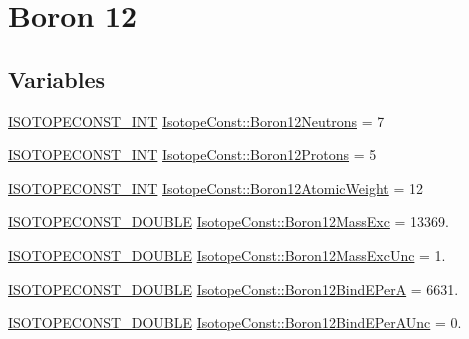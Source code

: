 \hypertarget{group___isotope_const-_boron-_b12}{}\section{Boron 12}
\label{group___isotope_const-_boron-_b12}
\subsection*{Variables}
\begin{DoxyCompactItemize}
\item 
\mbox{\hyperlink{group___isotope_const-_macros_ga5f18360b3e99483a35c32d789e62621c}{I\+S\+O\+T\+O\+P\+E\+C\+O\+N\+S\+T\+\_\+\+I\+NT}} \mbox{\hyperlink{group___isotope_const-_boron-_b12_gad7226c695d34ad5dd0b0832c49045c21}{Isotope\+Const\+::\+Boron12\+Neutrons}} = 7
\item 
\mbox{\hyperlink{group___isotope_const-_macros_ga5f18360b3e99483a35c32d789e62621c}{I\+S\+O\+T\+O\+P\+E\+C\+O\+N\+S\+T\+\_\+\+I\+NT}} \mbox{\hyperlink{group___isotope_const-_boron-_b12_gae284f60786b1649d05b5fe7b321055e3}{Isotope\+Const\+::\+Boron12\+Protons}} = 5
\item 
\mbox{\hyperlink{group___isotope_const-_macros_ga5f18360b3e99483a35c32d789e62621c}{I\+S\+O\+T\+O\+P\+E\+C\+O\+N\+S\+T\+\_\+\+I\+NT}} \mbox{\hyperlink{group___isotope_const-_boron-_b12_ga0fdc71b3ba380d4820aa5954676826e4}{Isotope\+Const\+::\+Boron12\+Atomic\+Weight}} = 12
\item 
\mbox{\hyperlink{group___isotope_const-_macros_ga8f45a7272ce02c0b4c65c44636ed719a}{I\+S\+O\+T\+O\+P\+E\+C\+O\+N\+S\+T\+\_\+\+D\+O\+U\+B\+LE}} \mbox{\hyperlink{group___isotope_const-_boron-_b12_gaabdd755065c10f3e7a689c3d3f642df5}{Isotope\+Const\+::\+Boron12\+Mass\+Exc}} = 13369.
\item 
\mbox{\hyperlink{group___isotope_const-_macros_ga8f45a7272ce02c0b4c65c44636ed719a}{I\+S\+O\+T\+O\+P\+E\+C\+O\+N\+S\+T\+\_\+\+D\+O\+U\+B\+LE}} \mbox{\hyperlink{group___isotope_const-_boron-_b12_gac721f7967cff55a88cbec2ffdec43c99}{Isotope\+Const\+::\+Boron12\+Mass\+Exc\+Unc}} = 1.
\item 
\mbox{\hyperlink{group___isotope_const-_macros_ga8f45a7272ce02c0b4c65c44636ed719a}{I\+S\+O\+T\+O\+P\+E\+C\+O\+N\+S\+T\+\_\+\+D\+O\+U\+B\+LE}} \mbox{\hyperlink{group___isotope_const-_boron-_b12_gad137cac20843ab816b384e8a85fc3766}{Isotope\+Const\+::\+Boron12\+Bind\+E\+PerA}} = 6631.
\item 
\mbox{\hyperlink{group___isotope_const-_macros_ga8f45a7272ce02c0b4c65c44636ed719a}{I\+S\+O\+T\+O\+P\+E\+C\+O\+N\+S\+T\+\_\+\+D\+O\+U\+B\+LE}} \mbox{\hyperlink{group___isotope_const-_boron-_b12_gad79a0d3290406e8c57fd08e73b158a63}{Isotope\+Const\+::\+Boron12\+Bind\+E\+Per\+A\+Unc}} = 0.

\end{DoxyCompactItemize}
